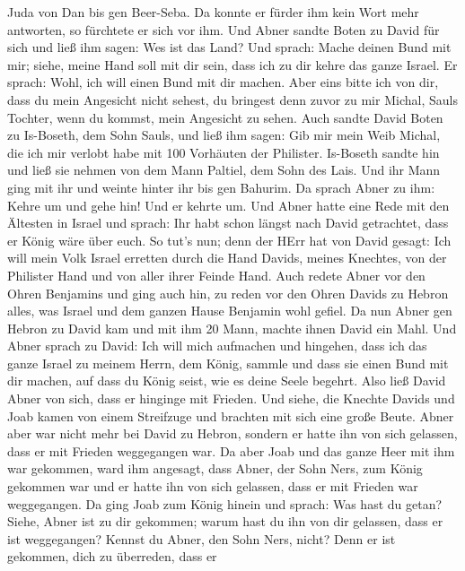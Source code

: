 Juda von Dan bis gen Beer-Seba.  Da konnte er fürder ihm
kein Wort mehr antworten, so fürchtete er sich vor ihm. 
Und Abner sandte Boten zu David für sich und ließ ihm sagen: Wes ist das
Land? Und sprach: Mache deinen Bund mit mir; siehe, meine Hand soll mit
dir sein, dass ich zu dir kehre das ganze Israel.  Er
sprach: Wohl, ich will einen Bund mit dir machen. Aber eins bitte ich
von dir, dass du mein Angesicht nicht sehest, du bringest denn zuvor zu
mir Michal, Sauls Tochter, wenn du kommst, mein Angesicht zu sehen.
 Auch sandte David Boten zu Is-Boseth, dem Sohn Sauls, und
ließ ihm sagen: Gib mir mein Weib Michal, die ich mir verlobt habe mit
100 Vorhäuten der Philister.  Is-Boseth sandte hin und ließ
sie nehmen von dem Mann Paltiel, dem Sohn des Lais.  Und
ihr Mann ging mit ihr und weinte hinter ihr bis gen Bahurim. Da sprach
Abner zu ihm: Kehre um und gehe hin! Und er kehrte um.  Und
Abner hatte eine Rede mit den Ältesten in Israel und sprach: Ihr habt
schon längst nach David getrachtet, dass er König wäre über euch.
 So tut's nun; denn der HErr hat von David gesagt: Ich will
mein Volk Israel erretten durch die Hand Davids, meines Knechtes, von
der Philister Hand und von aller ihrer Feinde Hand.  Auch
redete Abner vor den Ohren Benjamins und ging auch hin, zu reden vor den
Ohren Davids zu Hebron alles, was Israel und dem ganzen Hause Benjamin
wohl gefiel.  Da nun Abner gen Hebron zu David kam und mit
ihm 20 Mann, machte ihnen David ein Mahl.  Und Abner sprach
zu David: Ich will mich aufmachen und hingehen, dass ich das ganze
Israel zu meinem Herrn, dem König, sammle und dass sie einen Bund mit
dir machen, auf dass du König seist, wie es deine Seele begehrt. Also
ließ David Abner von sich, dass er hinginge mit Frieden. 
Und siehe, die Knechte Davids und Joab kamen von einem Streifzuge und
brachten mit sich eine große Beute. Abner aber war nicht mehr bei David
zu Hebron, sondern er hatte ihn von sich gelassen, dass er mit Frieden
weggegangen war.  Da aber Joab und das ganze Heer mit ihm
war gekommen, ward ihm angesagt, dass Abner, der Sohn Ners, zum König
gekommen war und er hatte ihn von sich gelassen, dass er mit Frieden war
weggegangen.  Da ging Joab zum König hinein und sprach: Was
hast du getan? Siehe, Abner ist zu dir gekommen; warum hast du ihn von
dir gelassen, dass er ist weggegangen?  Kennst du Abner,
den Sohn Ners, nicht? Denn er ist gekommen, dich zu überreden, dass er
